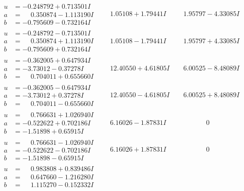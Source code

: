 \documentclass[1p]{elsarticle_modified}
\theoremstyle{definition}
\begin{document}
$$\begin{array}{c|c|c}
\begin{aligned}
u &= -0.248792 + 0.713501 I \\
a &= \phantom{-}0.350874 - 1.113190 I \\
b &= -0.795609 - 0.732164 I\end{aligned}
 & \phantom{-}1.05108 + 1.79441 I & \phantom{-}1.95797 - 4.33085 I \\ \hline\begin{aligned}
u &= -0.248792 - 0.713501 I \\
a &= \phantom{-}0.350874 + 1.113190 I \\
b &= -0.795609 + 0.732164 I\end{aligned}
 & \phantom{-}1.05108 - 1.79441 I & \phantom{-}1.95797 + 4.33085 I \\ \hline\begin{aligned}
u &= -0.362005 + 0.647934 I \\
a &= -3.73012 - 0.37278 I \\
b &= \phantom{-}0.704011 + 0.655660 I\end{aligned}
 & \phantom{-}12.40550 + 4.61805 I & \phantom{-}6.00525 - 8.48089 I \\ \hline\begin{aligned}
u &= -0.362005 - 0.647934 I \\
a &= -3.73012 + 0.37278 I \\
b &= \phantom{-}0.704011 - 0.655660 I\end{aligned}
 & \phantom{-}12.40550 - 4.61805 I & \phantom{-}6.00525 + 8.48089 I \\ \hline\begin{aligned}
u &= \phantom{-}0.766631 + 1.026940 I \\
a &= -0.522622 + 0.702186 I \\
b &= -1.51898 + 0.65915 I\end{aligned}
 & \phantom{-}6.16026 - 1.87831 I & \phantom{-0.000000 } 0 \\ \hline\begin{aligned}
u &= \phantom{-}0.766631 - 1.026940 I \\
a &= -0.522622 - 0.702186 I \\
b &= -1.51898 - 0.65915 I\end{aligned}
 & \phantom{-}6.16026 + 1.87831 I & \phantom{-0.000000 } 0 \\ \hline\begin{aligned}
u &= \phantom{-}0.983808 + 0.839486 I \\
a &= \phantom{-}0.647660 - 1.216280 I \\
b &= \phantom{-}1.115270 - 0.152332 I\end{aligned}

\end{array}$$
\end{document}
